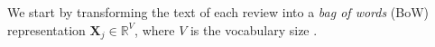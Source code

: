 \documentclass[letterpaper]{article} %
\newcommand{\+}[1]{\boldsymbol{\mathbf{#1}}}
\def\*#1{\mathbf{#1}}
\begin{document}
We start by transforming the text of each review into a \textit{bag of words} (BoW) representation $\mathbf{X}_j\in \mathbb{R}^V$, where $V$ is the vocabulary size \cite{NIPS2009_3856}.
%
%
%
%
\end{document}
